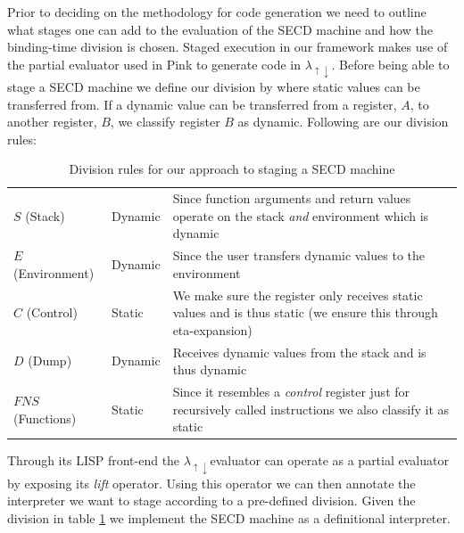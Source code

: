 \documentclass{article}
\theoremstyle{definition}
\newcommand{\mslang}{$\lambda_{\uparrow\downarrow}$}
\begin{document}
Prior to deciding on the methodology for code generation we need to outline what stages one can add to the evaluation of the SECD machine and how the binding-time division is chosen. Staged execution in our framework makes use of the partial evaluator used in Pink \cite{amin2017collapsing} to generate code in \mslang. Before being able to stage a SECD machine we define our division by where static values can be transferred from. If a dynamic value can be transferred from a register, $A$, to another register, $B$, we classify register $B$ as dynamic. Following are our division rules:
\begin{table}[!htbp]
  \centering
  \begin{tabular}{|p{3cm}|p{3cm}|p{6cm}|}
 	\hline
 	\thead{SECD Register}	&	\thead{Classification}	&	\thead{Reason}	\\ \hline
	$S$ (Stack)				&	Dynamic				&	Since function arguments and return values operate on the stack \textit{and} environment which is dynamic \\ \hline

	$E$ (Environment)		&	Dynamic			&	Since the user transfers dynamic values to the environment \\ \hline

	$C$ (Control)				&	Static				& We make sure the register only receives static values and is thus static (we ensure this through eta-expansion)  \\ \hline

	$D$ (Dump)				&	Dynamic				&	Receives dynamic values from the stack and is thus dynamic \\ \hline

	$FNS$ (Functions)		&	Static				&	Since it resembles a \textit{control} register just for recursively called instructions we also classify it as static \\

	\hline
  \end{tabular}
  \caption{Division rules for our approach to staging a SECD machine}
  \label{tbl:secd_division}
\end{table}

Through its LISP front-end the \mslang evaluator can operate as a partial evaluator by exposing its \textit{lift} operator. Using this operator we can then annotate the interpreter we want to stage according to a pre-defined division. Given the division in table \ref{tbl:secd_division} we implement the SECD machine as a definitional interpreter.
\end{document}
